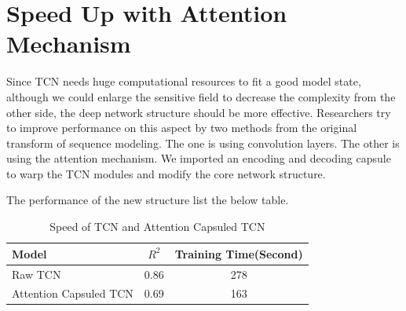 \section{Speed Up with Attention Mechanism}
Since TCN needs huge computational resources to fit a good model state, although we could enlarge the sensitive field to decrease the complexity from the other side, the deep network structure should be more effective. Researchers try to improve performance on this aspect by two methods from the original transform of sequence modeling. The one is using convolution layers. The other is using the attention mechanism. We imported an encoding and decoding capsule to warp the TCN modules and modify the core network structure. 

The performance of the new structure list the below table.
\begin{table}[H]
\centering
\caption{Speed of TCN and Attention Capsuled TCN}
\begin{tabular}{l c c}
\toprule
\textbf{Model} & \textbf{$R^2$}& \textbf{Training Time(Second)}\\
\midrule
Raw TCN &0.86& 278\\
Attention Capsuled TCN &0.69 & 163\\
\bottomrule
\end{tabular}
\label{tab:attentionTCN}
\end{table}